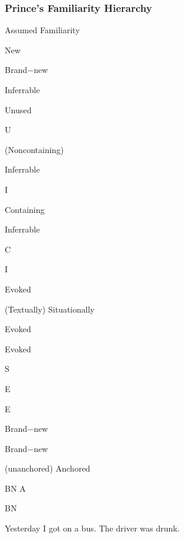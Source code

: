 \documentclass[compress,color=usenames]{beamer}
\begin{document}
\begin{frame}
\frametitle{
Prince's Familiarity Hierarchy}



Assumed Familiarity






New






Brand$-$new






Inferrable






Unused



U






(Noncontaining)



Inferrable



I






Containing



Inferrable



C



I






Evoked






(Textually) Situationally



Evoked



Evoked



S



E



E






Brand$-$new



Brand$-$new



(unanchored) Anchored



BN A



BN






Yesterday I got on a bus. The driver was drunk.










\end{frame}
\end{document}
